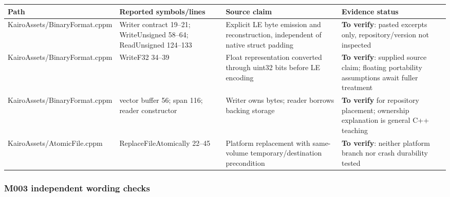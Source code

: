 {\def\LTcaptype{none} %
\begin{longtable}[]{@{}
  >{\raggedright\arraybackslash}p{}
  >{\raggedright\arraybackslash}p{}
  >{\raggedright\arraybackslash}p{}
  >{\raggedright\arraybackslash}p{}@{}}
\toprule\noalign{}
\begin{minipage}[b]{\linewidth}\raggedright
Path
\end{minipage} & \begin{minipage}[b]{\linewidth}\raggedright
Reported symbols/lines
\end{minipage} & \begin{minipage}[b]{\linewidth}\raggedright
Source claim
\end{minipage} & \begin{minipage}[b]{\linewidth}\raggedright
Evidence status
\end{minipage} \\
\midrule\noalign{}
\endhead
\bottomrule\noalign{}
\endlastfoot
KairoAssets/BinaryFormat.cppm & Writer contract 19--21; WriteUnsigned 58--64; ReadUnsigned 124--133 & Explicit LE byte emission and reconstruction, independent of native struct padding & \textbf{To verify}: pasted excerpts only, repository/version not inspected \\
KairoAssets/BinaryFormat.cppm & WriteF32 34--39 & Float representation converted through uint32 bits before LE encoding & \textbf{To verify}: supplied source claim; floating portability assumptions await fuller treatment \\
KairoAssets/BinaryFormat.cppm & vector buffer 56; span 116; reader constructor & Writer owns bytes; reader borrows backing storage & \textbf{To verify} for repository placement; ownership explanation is general C++ teaching \\
KairoAssets/AtomicFile.cppm & ReplaceFileAtomically 22--45 & Platform replacement with same-volume temporary/destination precondition & \textbf{To verify}: neither platform branch nor crash durability tested \\
\end{longtable}
}

\subsubsection{M003 independent wording checks}\label{appendix-a103e7846d21-m003-independent-wording-checks}

